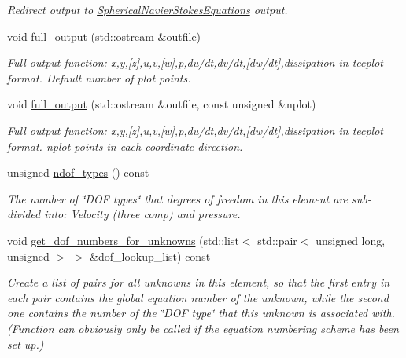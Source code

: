 \begin{DoxyCompactItemize}
\begin{DoxyCompactList}\small\item\em Redirect output to \hyperlink{classoomph_1_1SphericalNavierStokesEquations}{Spherical\+Navier\+Stokes\+Equations} output. \end{DoxyCompactList}\item 
void \hyperlink{classoomph_1_1QSphericalCrouzeixRaviartElement_a777870285a6b1534bdeb8075fcad2299}{full\+\_\+output} (std\+::ostream \&outfile)
\begin{DoxyCompactList}\small\item\em Full output function\+: x,y,\mbox{[}z\mbox{]},u,v,\mbox{[}w\mbox{]},p,du/dt,dv/dt,\mbox{[}dw/dt\mbox{]},dissipation in tecplot format. Default number of plot points. \end{DoxyCompactList}\item 
void \hyperlink{classoomph_1_1QSphericalCrouzeixRaviartElement_a1e6532c250abfc46f2c24d2ccfdcfaaa}{full\+\_\+output} (std\+::ostream \&outfile, const unsigned \&nplot)
\begin{DoxyCompactList}\small\item\em Full output function\+: x,y,\mbox{[}z\mbox{]},u,v,\mbox{[}w\mbox{]},p,du/dt,dv/dt,\mbox{[}dw/dt\mbox{]},dissipation in tecplot format. nplot points in each coordinate direction. \end{DoxyCompactList}\item 
unsigned \hyperlink{classoomph_1_1QSphericalCrouzeixRaviartElement_af9984dcf9685e350ebb1173a511c9594}{ndof\+\_\+types} () const
\begin{DoxyCompactList}\small\item\em The number of \char`\"{}\+D\+O\+F types\char`\"{} that degrees of freedom in this element are sub-\/divided into\+: Velocity (three comp) and pressure. \end{DoxyCompactList}\item 
void \hyperlink{classoomph_1_1QSphericalCrouzeixRaviartElement_ac6a63310d1f2e4de8c0310c86c2aa9f9}{get\+\_\+dof\+\_\+numbers\+\_\+for\+\_\+unknowns} (std\+::list$<$ std\+::pair$<$ unsigned long, unsigned $>$ $>$ \&dof\+\_\+lookup\+\_\+list) const
\begin{DoxyCompactList}\small\item\em Create a list of pairs for all unknowns in this element, so that the first entry in each pair contains the global equation number of the unknown, while the second one contains the number of the \char`\"{}\+D\+O\+F type\char`\"{} that this unknown is associated with. (Function can obviously only be called if the equation numbering scheme has been set up.) \end{DoxyCompactList}\end{DoxyCompactItemize}
